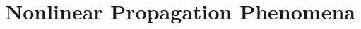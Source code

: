 \chapter[Nonlinear Propagation Phenomena]
  {Nonlinear Propagation Phenomena}
  \label{chp:nonlinear}